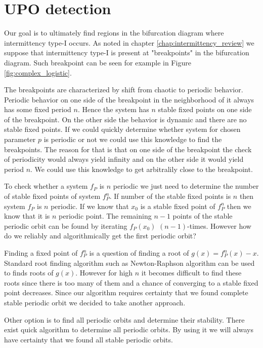 \section{UPO detection}
Our goal is to ultimately find regions in the bifurcation diagram where intermittency type-I occurs.
As noted in chapter \ref{chap:intermittency_review} we suppose that intermittency type-I is present at "breakpoints" in the bifurcation diagram.
Such breakpoint can be seen for example in Figure \ref{fig:complex_logistic}.
\par
The breakpoints are characterized by shift from chaotic to periodic behavior.
Periodic behavior on one side of the breakpoint in the neighborhood of it always has some fixed period $n$.
Hence the system has $n$ stable fixed points on one side of the breakpoint.
On the other side the behavior is dynamic and there are no stable fixed points.
If we could quickly determine whether system for chosen parameter $p$ is periodic or not we could use this knowledge to find the breakpoints.
The reason for that is that on one side of the breakpoint the check of periodicity would always yield infinity and on the other side it would yield period $n$.
We could use this knowledge to get arbitralily close to the breakpoint.
\par
To check whether a system $f_P$ is $n$ periodic we just need to determine the number of stable fixed points of system $f^{n}_P$.
If number of the stable fixed points is $n$ then system $f_P$ is $n$ periodic.
If we know that $x_0$ is a stable fixed point of $f^{n}_P$ then we know that it is $n$ periodic point.
The remaining $n-1$ points of the stable periodic orbit can be found by iterating $f_P(x_0)$ $(n-1)$-times.
However how do we reliably and algorithmically get the first periodic orbit?
\par
Finding a fixed point of $f^{n}_{P}$ is a question of finding a root of $g(x) = f^{n}_{P}(x) - x$.
Standard root finding algorithm such as Newton-Raphson algorithm can be used to finds roots of $g(x)$.
However for high $n$ it becomes difficult to find these roots since there is too many of them and a chance of converging to a stable fixed point decreases.
Since our algorithm requires certainty that we found complete stable periodic orbit we decided to take another approach.
\par
Other option is to find all periodic orbits and determine their stability.
There exist quick algorithm to determine all periodic orbits.
By using it we will always have certainty that we found all stable periodic orbits.

